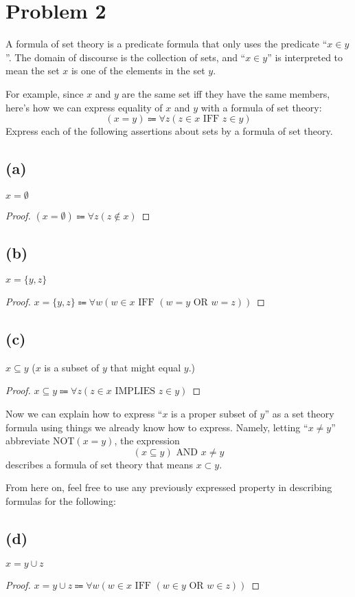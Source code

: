 \documentclass[14pt]{extarticle}
\begin{document}
\section{Problem 2}
A formula of set theory is a predicate formula that only uses the predicate ``$x \in y$”. The domain of discourse is the collection of sets, and ``$x \in y$” is interpreted to mean the set $x$ is one of the elements in the set $y$.

For example, since $x$ and $y$ are the same set iff they have the same members, here’s how we can express equality of $x$ and $y$ with a formula of set theory:
$$
(x = y) \Coloneqq \forall z(z \in x \text{ IFF } z \in y)
$$
Express each of the following assertions about sets by a formula of set theory.
\subsection{(a)}
$x = \emptyset$
\begin{proof}
$(x = \emptyset) \Coloneqq \forall z (z \notin x)$
\end{proof}

\subsection{(b)}
$x = \{y, z\}$
\begin{proof}
$x = \{y, z\} \Coloneqq \forall w (w \in x \text{ IFF } (w = y \text{ OR } w = z))$
\end{proof}

\subsection{(c)}
$x \subseteq y$ ($x$ is a subset of $y$ that might equal $y$.)
\begin{proof}
$x \subseteq y \Coloneqq \forall z (z \in x \text{ IMPLIES } z \in y)$
\end{proof}

Now we can explain how to express “$x$ is a proper subset of $y$” as a set theory formula using things we already know how to express. Namely, letting “$x \neq y$” abbreviate NOT$(x = y)$, the expression
$$
(x \subseteq y) \text{ AND } x \neq y
$$
describes a formula of set theory that means $x \subset y$.

From here on, feel free to use any previously expressed property in describing formulas for the following:

\subsection{(d)}
$x = y \cup z$
\begin{proof}
$x = y \cup z \Coloneqq \forall w (w \in x \text{ IFF } (w \in y \text{ OR } w \in z))$
\end{proof}
\end{document}
